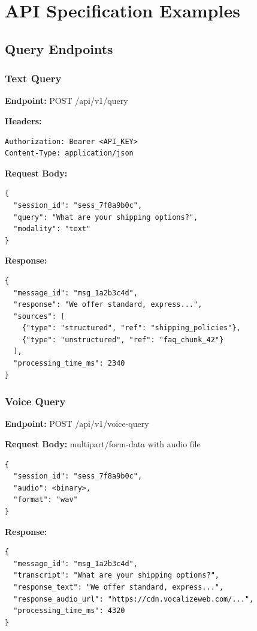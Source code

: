 \appendix
{}

\chapter{API Specification Examples}

\section{Query Endpoints}

\subsection{Text Query}

\textbf{Endpoint:} POST /api/v1/query

\textbf{Headers:}
\begin{lstlisting}
Authorization: Bearer <API_KEY>
Content-Type: application/json
\end{lstlisting}

\textbf{Request Body:}
\begin{lstlisting}
{
  "session_id": "sess_7f8a9b0c",
  "query": "What are your shipping options?",
  "modality": "text"
}
\end{lstlisting}

\textbf{Response:}
\begin{lstlisting}
{
  "message_id": "msg_1a2b3c4d",
  "response": "We offer standard, express...",
  "sources": [
    {"type": "structured", "ref": "shipping_policies"},
    {"type": "unstructured", "ref": "faq_chunk_42"}
  ],
  "processing_time_ms": 2340
}
\end{lstlisting}

\subsection{Voice Query}

\textbf{Endpoint:} POST /api/v1/voice-query

\textbf{Request Body:} multipart/form-data with audio file
\begin{lstlisting}
{
  "session_id": "sess_7f8a9b0c",
  "audio": <binary>,
  "format": "wav"
}
\end{lstlisting}

\textbf{Response:}
\begin{lstlisting}
{
  "message_id": "msg_1a2b3c4d",
  "transcript": "What are your shipping options?",
  "response_text": "We offer standard, express...",
  "response_audio_url": "https://cdn.vocalizeweb.com/...",
  "processing_time_ms": 4320
}
\end{lstlisting}

